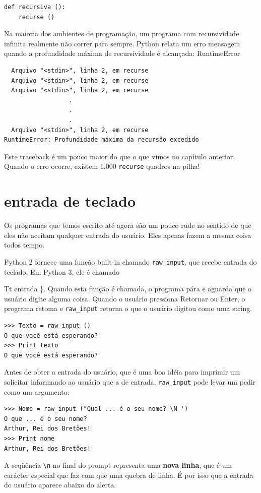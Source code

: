 \documentclass[10pt]{book}
\begin{document}
{\begin{verbatim}
def recursiva ():
    recurse ()
\end{verbatim}
%
Na maioria dos ambientes de programação, um programa com recursividade infinita
realmente não correr para sempre. Python relata um erro
mensagem quando a profundidade máxima de recursividade é alcançada:
\index{} RuntimeError

\begin{verbatim}
  Arquivo "<stdin>", linha 2, em recurse
  Arquivo "<stdin>", linha 2, em recurse
  Arquivo "<stdin>", linha 2, em recurse
                  .   
                  .
                  .
  Arquivo "<stdin>", linha 2, em recurse
RuntimeError: Profundidade máxima da recursão excedido
\end{verbatim}
%
Este traceback é um pouco maior do que o que vimos no
capítulo anterior. Quando o erro ocorre, existem 1.000
{\tt recurse} quadros na pilha!


\section{entrada de teclado}

Os programas que temos escrito até agora são um pouco rude no sentido de que
eles não aceitam qualquer entrada do usuário. Eles apenas fazem a mesma coisa todos
tempo.

Python 2 fornece uma função built-in chamado \verb "raw_input", que recebe
entrada do teclado. Em Python 3, ele é chamado
  {Tt entrada \}. Quando esta função é chamada, o programa pára e
aguarda que o usuário digite alguma coisa. Quando o usuário pressiona {\sf
  Retornar} ou {\sf Enter}, o programa retoma e \verb "raw_input"
retorna o que o usuário digitou como uma string.

\begin{verbatim}
>>> Texto = raw_input ()
O que você está esperando?
>>> Print texto
O que você está esperando?
\end{verbatim}
%
Antes de obter a entrada do usuário, que é uma boa idéia para imprimir um
solicitar informando ao usuário que a de entrada. \Verb "raw_input" pode levar um
pedir como um argumento:

\begin{verbatim}
>>> Nome = raw_input ("Qual ... é o seu nome? \N ')
O que ... é o seu nome?
Arthur, Rei dos Bretões!
>>> Print nome
Arthur, Rei dos Bretões!
\end{verbatim}
%
A seqüência \verb "\n" no final do prompt representa uma {\bf nova linha},
que é um carácter especial que faz com que uma quebra de linha.
É por isso que a entrada do usuário aparece abaixo do alerta.

}}
\end{document}
